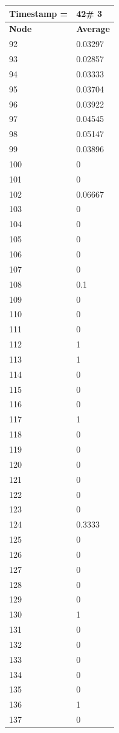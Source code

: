 \begin{tabular}{|l||l|}
\hline
\textbf{Timestamp =} & \textbf{42}\# 3\\\hline
	\textbf{Node} & \textbf{Average} \\ \hline
\hline
	92 & 0.03297 \\ \hline
	93 & 0.02857 \\ \hline
	94 & 0.03333 \\ \hline
	95 & 0.03704 \\ \hline
	96 & 0.03922 \\ \hline
	97 & 0.04545 \\ \hline
	98 & 0.05147 \\ \hline
	99 & 0.03896 \\ \hline
	100 & 0 \\ \hline
	101 & 0 \\ \hline
	102 & 0.06667 \\ \hline
	103 & 0 \\ \hline
	104 & 0 \\ \hline
	105 & 0 \\ \hline
	106 & 0 \\ \hline
	107 & 0 \\ \hline
	108 & 0.1 \\ \hline
	109 & 0 \\ \hline
	110 & 0 \\ \hline
	111 & 0 \\ \hline
	112 & 1 \\ \hline
	113 & 1 \\ \hline
	114 & 0 \\ \hline
	115 & 0 \\ \hline
	116 & 0 \\ \hline
	117 & 1 \\ \hline
	118 & 0 \\ \hline
	119 & 0 \\ \hline
	120 & 0 \\ \hline
	121 & 0 \\ \hline
	122 & 0 \\ \hline
	123 & 0 \\ \hline
	124 & 0.3333 \\ \hline
	125 & 0 \\ \hline
	126 & 0 \\ \hline
	127 & 0 \\ \hline
	128 & 0 \\ \hline
	129 & 0 \\ \hline
	130 & 1 \\ \hline
	131 & 0 \\ \hline
	132 & 0 \\ \hline
	133 & 0 \\ \hline
	134 & 0 \\ \hline
	135 & 0 \\ \hline
	136 & 1 \\ \hline
	137 & 0 \\ \hline
\end{tabular}

